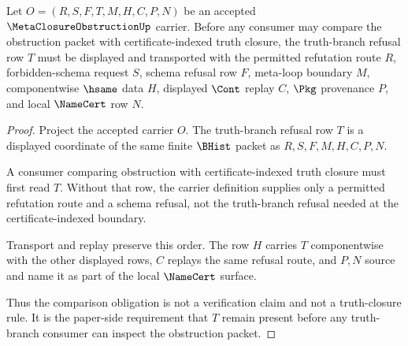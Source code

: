 
\begin{theorem}
\label{thm:metaclosure-obstruction-truth-branch-obligation}
Let $O=(R,S,F,T,M,H,C,P,N)$ be an accepted $\MetaClosureObstructionUp$ carrier. Before any consumer may compare the obstruction packet with certificate-indexed truth closure, the truth-branch refusal row $T$ must be displayed and transported with the permitted refutation route $R$, forbidden-schema request $S$, schema refusal row $F$, meta-loop boundary $M$, componentwise $\hsame$ data $H$, displayed $\Cont$ replay $C$, $\Pkg$ provenance $P$, and local $\NameCert$ row $N$.
\end{theorem}
\begin{proof}
Project the accepted carrier $O$. The truth-branch refusal row $T$ is a displayed coordinate of the same finite $\BHist$ packet as $R,S,F,M,H,C,P,N$.

A consumer comparing obstruction with certificate-indexed truth closure must first read $T$. Without that row, the carrier definition supplies only a permitted refutation route and a schema refusal, not the truth-branch refusal needed at the certificate-indexed boundary.

Transport and replay preserve this order. The row $H$ carries $T$ componentwise with the other displayed rows, $C$ replays the same refusal route, and $P,N$ source and name it as part of the local $\NameCert$ surface.

Thus the comparison obligation is not a verification claim and not a truth-closure rule. It is the paper-side requirement that $T$ remain present before any truth-branch consumer can inspect the obstruction packet.
\end{proof}

